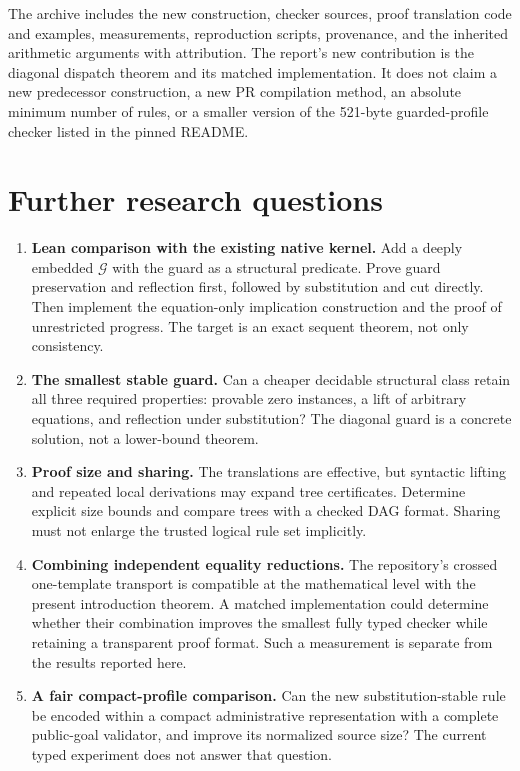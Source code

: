 \documentclass[11pt]{article}
\theoremstyle{definition}
\theoremstyle{remark}
\begin{document}
The archive includes the new construction, checker sources, proof
translation code and examples, measurements, reproduction scripts,
provenance, and the inherited arithmetic arguments with attribution.
The report's new contribution is the diagonal dispatch theorem and its
matched implementation. It does not claim a new predecessor construction,
a new PR compilation method, an absolute minimum number of rules, or a
smaller version of the 521-byte guarded-profile checker listed in the pinned README.

\section{Further research questions}
\label{sec:research}

\begin{enumerate}
\item \textbf{Lean comparison with the existing native kernel.}
Add a deeply embedded \(\mathcal G\) with the guard as a structural
predicate. Prove guard preservation and reflection first, followed by
substitution and cut directly. Then implement the equation-only
implication construction and the proof of unrestricted progress.
The target is an exact sequent theorem, not only consistency.
\item \textbf{The smallest stable guard.}
Can a cheaper decidable structural class retain all three required
properties: provable zero instances, a lift of arbitrary equations,
and reflection under substitution? The diagonal guard is a concrete
solution, not a lower-bound theorem.
\item \textbf{Proof size and sharing.}
The translations are effective, but syntactic lifting and repeated local
derivations may expand tree certificates. Determine explicit size bounds
and compare trees with a checked DAG format. Sharing must not enlarge the
trusted logical rule set implicitly.
\item \textbf{Combining independent equality reductions.}
The repository's crossed one-template transport is compatible at the
mathematical level with the present introduction theorem. A matched
implementation could determine whether their combination improves the
smallest fully typed checker while retaining a transparent proof format.
Such a measurement is separate from the results reported here.
\item \textbf{A fair compact-profile comparison.}
Can the new substitution-stable rule be encoded within a compact
administrative representation with a complete public-goal validator,
and improve its normalized source size? The current typed experiment
does not answer that question.
\end{enumerate}
\end{document}
